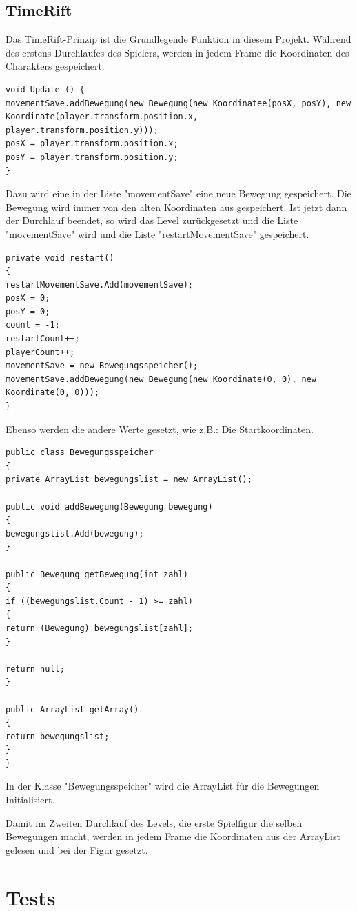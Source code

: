 \section{TimeRift}
Das TimeRift-Prinzip ist die Grundlegende Funktion in diesem Projekt. Während des erstens Durchlaufes des Spielers, werden in jedem Frame die Koordinaten des Charakters gespeichert.
\begin{lstlisting}[language={[Sharp]C}]
void Update () {
movementSave.addBewegung(new Bewegung(new Koordinatee(posX, posY), new Koordinate(player.transform.position.x, player.transform.position.y)));
posX = player.transform.position.x;
posY = player.transform.position.y;
}
\end{lstlisting}
Dazu wird eine in der Liste "movementSave" eine neue Bewegung gespeichert. Die Bewegung wird immer von den alten Koordinaten aus gespeichert. Ist jetzt dann der Durchlauf beendet, so wird das Level zurückgesetzt und die Liste "movementSave" wird und die Liste "restartMovementSave" gespeichert.
\begin{lstlisting}[language={[Sharp]C}]
private void restart()
{
restartMovementSave.Add(movementSave);
posX = 0;
posY = 0;
count = -1;
restartCount++;
playerCount++;
movementSave = new Bewegungsspeicher();
movementSave.addBewegung(new Bewegung(new Koordinate(0, 0), new Koordinate(0, 0)));
}
\end{lstlisting}
Ebenso werden die andere Werte gesetzt, wie z.B.: Die Startkoordinaten.
\begin{lstlisting}[language={[Sharp]C}]
public class Bewegungsspeicher
{
private ArrayList bewegungslist = new ArrayList();

public void addBewegung(Bewegung bewegung)
{
bewegungslist.Add(bewegung);
}

public Bewegung getBewegung(int zahl)
{
if ((bewegungslist.Count - 1) >= zahl)
{
return (Bewegung) bewegungslist[zahl];
}

return null;
}

public ArrayList getArray()
{
return bewegungslist;
}
}
\end{lstlisting}
In der Klasse "Bewegungsspeicher" wird die ArrayList für die Bewegungen Initialisiert.

Damit im Zweiten Durchlauf des Levels, die erste Spielfigur die selben Bewegungen macht, werden in jedem Frame die Koordinaten aus der ArrayList gelesen und bei der Figur gesetzt.

\chapter{Tests}

